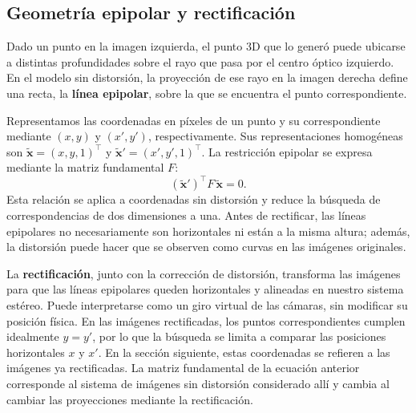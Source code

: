 \documentclass[a4paper,11pt]{article}
\begin{document}
\subsection{Geometría epipolar y rectificación}
Dado un punto en la imagen izquierda, el punto 3D que lo generó puede ubicarse a distintas profundidades sobre el rayo que pasa por el centro óptico izquierdo. En el modelo sin distorsión, la proyección de ese rayo en la imagen derecha define una recta, la \textbf{línea epipolar}, sobre la que se encuentra el punto correspondiente.

Representamos las coordenadas en píxeles de un punto y su correspondiente mediante $(x,y)$ y $(x',y')$, respectivamente. Sus representaciones homogéneas son $\tilde{\mathbf{x}}=(x,y,1)^\top$ y $\tilde{\mathbf{x}}'=(x',y',1)^\top$. La restricción epipolar se expresa mediante la matriz fundamental $F$:
\begin{equation}
(\tilde{\mathbf{x}}')^\top F\,\tilde{\mathbf{x}} = 0.
\end{equation}
Esta relación se aplica a coordenadas sin distorsión y reduce la búsqueda de correspondencias de dos dimensiones a una. Antes de rectificar, las líneas epipolares no necesariamente son horizontales ni están a la misma altura; además, la distorsión puede hacer que se observen como curvas en las imágenes originales.

La \textbf{rectificación}, junto con la corrección de distorsión, transforma las imágenes para que las líneas epipolares queden horizontales y alineadas en nuestro sistema estéreo. Puede interpretarse como un giro virtual de las cámaras, sin modificar su posición física. En las imágenes rectificadas, los puntos correspondientes cumplen idealmente $y=y'$, por lo que la búsqueda se limita a comparar las posiciones horizontales $x$ y $x'$. En la sección siguiente, estas coordenadas se refieren a las imágenes ya rectificadas. La matriz fundamental de la ecuación anterior corresponde al sistema de imágenes sin distorsión considerado allí y cambia al cambiar las proyecciones mediante la rectificación.
\end{document}
